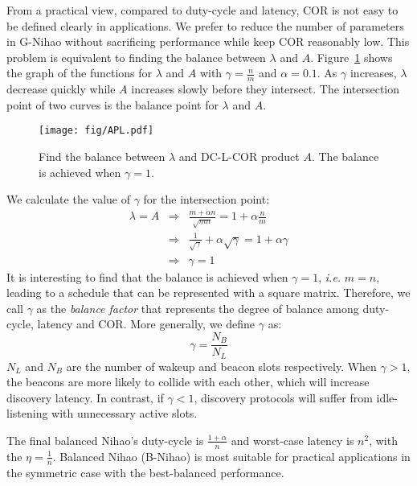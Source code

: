 \documentclass[conference]{IEEEtran}
\begin{document}
From a practical view, compared to duty-cycle and latency, COR is not easy to be defined clearly in applications.
We prefer to reduce the number of parameters in G-Nihao without sacrificing performance while keep COR reasonably low.
This problem is equivalent to finding the balance between $\lambda$ and $A$.
Figure~\ref{apl} shows the graph of the functions for $\lambda$ and $A$ with $\gamma=\frac{n}{m}$ and $\alpha=0.1$.
As $\gamma$ increases, $\lambda$ decrease quickly while $A$ increases slowly before they intersect.
The intersection point of two curves is the balance point for $\lambda$ and $A$.

\begin{figure}[t]
    \centering
    \texttt{[image: fig/APL.pdf]}
    \caption{Find the balance between $\lambda$ and DC-L-COR product $A$. The balance is achieved when $\gamma=1$.}\label{apl}
\end{figure}

We calculate the value of $\gamma$ for the intersection point:
\begin{eqnarray}
    \lambda = A & \Rightarrow & \frac{m+\alpha n}{\sqrt{mn}}=1+ \alpha \frac{n}{m} \nonumber \\
                & \Rightarrow & \frac{1}{\sqrt{\gamma}}+  \alpha \sqrt{\gamma} =  1 + \alpha \gamma \nonumber \\
                & \Rightarrow & \gamma = 1 \nonumber
\end{eqnarray}
It is interesting to find that the balance is achieved when $\gamma=1$, \emph{i.e.} $m=n$,
leading to a schedule that can be represented with a square matrix.
Therefore, we call $\gamma$ as the \emph{balance factor} that represents the degree of balance among duty-cycle, latency and COR.
More generally, we define $\gamma$ as:
\begin{displaymath}
    \gamma = \frac{N_B}{N_L}
\end{displaymath}
$N_L$ and $N_B$ are the number of wakeup and beacon slots respectively.
When $\gamma > 1$, the beacons are more likely to collide with each other, which will increase discovery latency.
In contrast, if $\gamma < 1$, discovery protocols will suffer from idle-listening with unnecessary active slots.

The final balanced Nihao's duty-cycle is $\frac{1+\alpha}{n}$ and worst-case latency is $n^2$, with the $\eta = \frac{1}{n}$.
Balanced Nihao (B-Nihao) is most suitable for practical applications in the symmetric case with the best-balanced performance.
\end{document}
